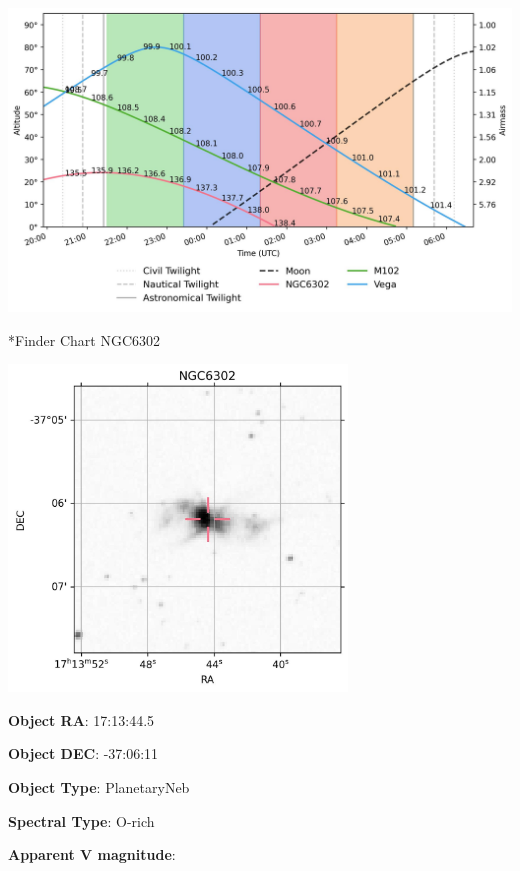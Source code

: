 \documentclass[12pt,preprintnumbers,amsmath,amssymb,nofootinbib,superscriptaddress]{revtex4-1}
\begin{document}
\begin{center}
    \includegraphics[height=0.8\textheight]{./example_output/airmass.jpg}
\end{center}


\newpage

*{Finder Chart NGC6302}\label{Ueff}

\begin{minipage}{0.6\textwidth}
    \includegraphics[width=9cm]{./example_output/finder_NGC6302.jpg}
\vspace{-2cm}

\end{minipage}
\begin{minipage}{0.3\textwidth}

\textbf{Object RA}: 17:13:44.5

\textbf{Object DEC}: -37:06:11

\textbf{Object Type}: PlanetaryNeb

\textbf{Spectral Type}: O-rich

\textbf{Apparent V magnitude}:  

\end{minipage}
\end{document}
